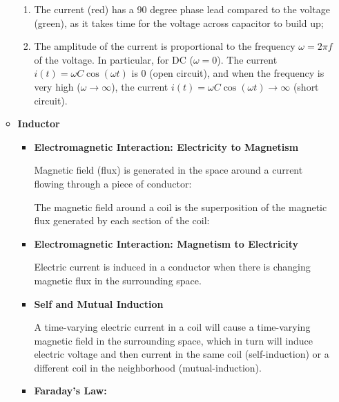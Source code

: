 \begin{itemize}
\begin{itemize}

  \begin{enumerate}
  \item The current (red) has a 90 degree phase lead compared to the 
    voltage (green), as it takes time for the voltage across capacitor 
    to build up;
  \item The amplitude of the current is proportional to the frequency 
    $\omega=2\pi f$ of the voltage. In particular, for DC ($\omega=0$). 
    The current $i(t)=\omega C\cos(\omega t)$ is 0 (open circuit), and
    when the frequency is very high ($\omega \rightarrow \infty$), the 
    current $i(t)=\omega C\cos(\omega t) \rightarrow \infty$ (short circuit).
  \end{enumerate}


\item {\bf Inductor}

  \begin{itemize}
  \item {\bf Electromagnetic Interaction: Electricity to Magnetism}

    Magnetic field (flux) is generated in the space around a current 
    flowing through a piece of conductor:


    The magnetic field around a coil is the superposition of the magnetic 
    flux generated by each section of the coil:


  \item {\bf Electromagnetic Interaction: Magnetism to Electricity}

    Electric current is induced in a conductor when there is changing
    magnetic flux in the surrounding space.

    

  \item {\bf Self and Mutual Induction}

    A time-varying electric current in a coil will cause a time-varying 
    magnetic field in the surrounding space, which in turn will induce 
    electric voltage and then current in the same coil (self-induction) 
    or a different coil in the neighborhood (mutual-induction).
    
  \item {\bf Faraday's Law:} 
    

\end{itemize}
\end{itemize}
\end{itemize}
